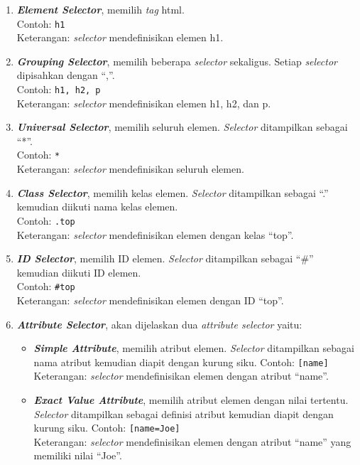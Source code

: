 \begin{enumerate}
	\item \textit{\textbf{Element Selector}}, memilih \textit{tag} html.\\
		Contoh: \texttt{h1}\\
		Keterangan: \textit{selector} mendefinisikan elemen h1.
	\item \textit{\textbf{Grouping Selector}}, memilih beberapa \textit{selector} sekaligus. Setiap \textit{selector} dipisahkan dengan ``,''.\\
		Contoh: \texttt{h1, h2, p}\\
		Keterangan: \textit{selector} mendefinisikan elemen h1, h2, dan p.
	\item \textit{\textbf{Universal Selector}}, memilih seluruh elemen. \textit{Selector} ditampilkan sebagai ``*''.\\
		Contoh: \texttt{*}\\
		Keterangan: \textit{selector} mendefinisikan seluruh elemen.
	\item \textit{\textbf{Class Selector}}, memilih kelas elemen. \textit{Selector} ditampilkan sebagai ``.'' kemudian diikuti nama kelas elemen.\\
		Contoh: \texttt{.top}\\
		Keterangan: \textit{selector} mendefinisikan elemen dengan kelas ``top''.
	\item \textit{\textbf{ID Selector}}, memilih ID elemen. \textit{Selector} ditampilkan sebagai ``\#'' kemudian diikuti ID elemen.\\
		Contoh: \texttt{\#top}\\
		Keterangan: \textit{selector} mendefinisikan elemen dengan ID ``top''. 
	\item \textit{\textbf{Attribute Selector}}, akan dijelaskan dua \textit{attribute selector} yaitu:
		\begin{itemize}
			\item \textit{\textbf{Simple Attribute}}, memilih atribut elemen. \textit{Selector} ditampilkan sebagai nama atribut kemudian diapit dengan kurung siku.
			Contoh: \texttt{[name]}\\
			Keterangan: \textit{selector} mendefinisikan elemen dengan atribut ``name''. 
			
			\item \textit{\textbf{Exact Value Attribute}}, memilih atribut elemen dengan nilai tertentu. \textit{Selector} ditampilkan sebagai definisi atribut kemudian diapit dengan kurung siku.
			Contoh: \texttt{[name=Joe]}\\
			Keterangan: \textit{selector} mendefinisikan elemen dengan atribut ``name'' yang memiliki nilai ``Joe''. 
		\end{itemize}
		

\end{enumerate}
